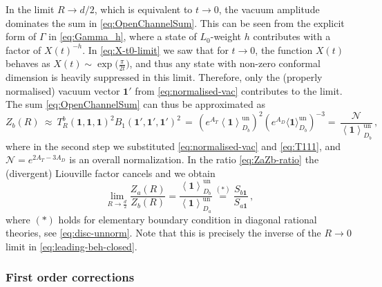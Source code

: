\documentclass[11pt,a4paper]{article}
\numberwithin{equation}{section}
\newcommand{\one}{\mathbf{1}} %
\begin{document}
In the limit $R\to d/2$, which is equivalent to $t\to0$, the vacuum amplitude dominates the sum in \eqref{eq:OpenChannelSum}. 
This can be seen from the explicit form of $\Gamma$ in \eqref{eq:Gamma_h}, where a state of $L_0$-weight $h$ contributes with a factor of $X(t)^{-h}$. 
In \eqref{eq:X-t0-limit} we saw that for $t \to 0$, the function $X(t)$ behaves as $X(t) \sim \exp\big(\frac{\pi}{2t}\big)$, 
and thus any state with non-zero conformal dimension is heavily suppressed in this limit. 
Therefore, only the (properly normalised) vacuum vector $\one'$ from \eqref{eq:normalised-vac} contributes to the limit. 
The sum \eqref{eq:OpenChannelSum} can thus be approximated as
\begin{equation}\label{eq:open-channel-vac-contrib}
    Z_b(R) ~\approx~  T_R^b(\one,\one,\one)^2  B_1(\one',\one',\one')^2
     \,=\, \left( e^{A_T} \left\langle\one\right\rangle_{D_b}^\mathrm{un} \right)^{2} \left(e^{A_D}\langle \one \rangle^\mathrm{un}_{D_b}\right)^{-3}
     =\, \frac{\mathcal{N}}{\left\langle\one\right\rangle_{D_b}^\mathrm{un}}
     \,,
\end{equation}
where in the second step we substituted \eqref{eq:normalised-vac} and \eqref{eq:T111}, and $\mathcal{N} = e^{2A_T -3A_D}$ is an overall normalization.
In the ratio \eqref{eq:ZaZb-ratio} the (divergent) Liouville factor cancels and we obtain
%
\begin{equation}\label{eq:R1/2Result}
    \lim_{R\to\frac{d}{2}}  \frac{Z_a(R)}{Z_b(R)} 
    = \frac{\left\langle\one\right\rangle_{D_b}^\mathrm{un}}{\left\langle\one\right\rangle_{D_a}^\mathrm{un}}
    \overset{(*)}= \frac{S_{b\one}}{S_{a\one}}
    \,,
\end{equation}
%
where $(*)$ holds for elementary boundary condition in diagonal rational theories, see \eqref{eq:disc-unnorm}.
%
Note that this is precisely the inverse of the $R\to 0$ limit in \eqref{eq:leading-beh-closed}.

\subsubsection{First order corrections}
\end{document}
